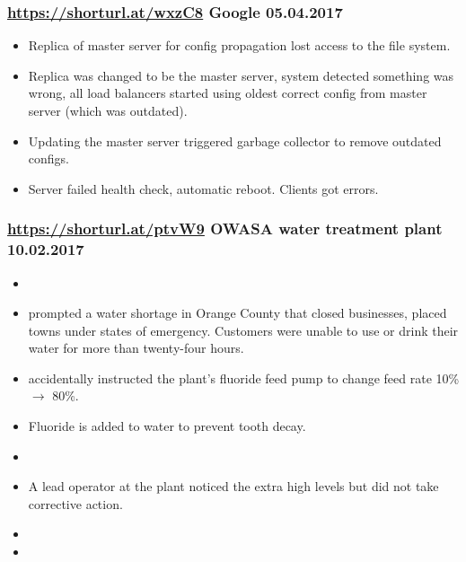 \documentclass[handout]{beamer}
\begin{document}
\begin{frame}
	\frametitle{
		\href{https://shorturl.at/wxzC8}{https://shorturl.at/wxzC8}
		Google
		05.04.2017
	}
	\begin{itemize}
		\item Replica of master server for config propagation lost access to the file system. \pause
		\item Replica was changed to be the master server, system detected something was wrong, all load balancers started using oldest correct config from master server (which was outdated). \pause
		\item Updating the master server triggered garbage collector to remove outdated configs. \pause
		\item Server failed health check, automatic reboot. Clients got errors.
	\end{itemize}
\end{frame}

\begin{frame}
	\frametitle{
		\href{https://shorturl.at/ptvW9}{https://shorturl.at/ptvW9}
		OWASA water treatment plant
		10.02.2017
	}
	\begin{itemize}
		\item {} \pause
		\item prompted a water shortage in Orange County that closed businesses, placed towns under states of emergency. Customers were unable to use or drink their water for more than twenty-four hours. \pause
		\item accidentally instructed the plant's fluoride feed pump to change feed rate 10\% $\to$ 80\%. \pause
		\item Fluoride is added to water to prevent tooth decay. \pause
		\item {} \pause
		\item A lead operator at the plant noticed the extra high levels but did not take corrective action. \pause
		\item {} \pause
		\item {}
	\end{itemize}
\end{frame}
\end{document}
